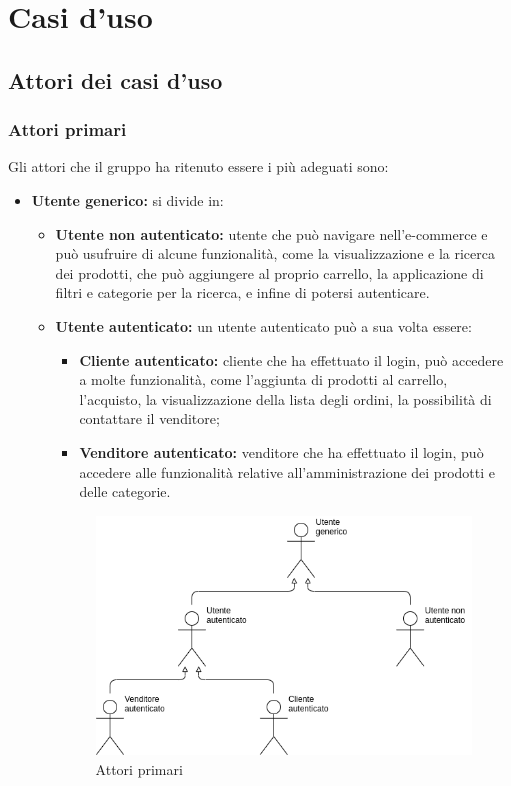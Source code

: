 \section{Casi d'uso}
    \subsection{Attori dei casi d'uso}
    \subsubsection{Attori primari}
    Gli attori che il gruppo ha ritenuto essere i più adeguati sono:
        \begin{itemize}
            \item \textbf{Utente generico:} si divide in:
                \begin{itemize}
                    \item \textbf{Utente non autenticato:} utente che può navigare nell'e-commerce e può usufruire di alcune funzionalità, come la visualizzazione e la ricerca dei prodotti, che può aggiungere al proprio carrello, la applicazione di filtri e categorie per la ricerca, e infine di potersi autenticare.
                    \item \textbf{Utente autenticato:} un utente autenticato può a sua volta essere:
                        \begin{itemize}
                            \item \textbf{Cliente autenticato:} cliente che ha effettuato il login, può accedere a molte funzionalità, come l'aggiunta di prodotti al carrello, l'acquisto, la visualizzazione della lista degli ordini, la possibilità di contattare il venditore;
                            \item \textbf{Venditore autenticato:} venditore che ha effettuato il login, può accedere alle funzionalità relative all'amministrazione dei prodotti e delle categorie.
                        \end{itemize}
                        \begin{figure}[!ht]
                            \caption{Attori primari}
                            \vspace{5px}
                            \includegraphics[scale=0.59]{../../../Images/AnalisiRequisiti/attori}

\end{figure}
\end{itemize}
\end{itemize}
